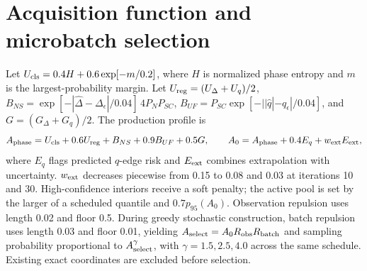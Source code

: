 \section{Acquisition function and microbatch selection}
Let $U_{\rm cls}=0.4H+0.6\exp[-m/0.2]$, where $H$ is normalized phase entropy and $m$ is the largest-probability margin. Let $U_{\rm reg}=(U_\Delta+U_q)/2$, $B_{NS}=\exp[-|\hat\Delta-\Delta_\epsilon|/0.04]\,4P_NP_{SC}$, $B_{UF}=P_{SC}\exp[-||\hat q|-q_\epsilon|/0.04]$, and $G=(G_\Delta+G_q)/2$.  The production profile is
\begin{equation} A_{\rm phase}=U_{\rm cls}+0.6U_{\rm reg}+B_{NS}+0.9B_{UF}+0.5G,\qquad A_0=A_{\rm phase}+0.4E_q+w_{\rm ext}E_{\rm ext},\end{equation}
where $E_q$ flags predicted $q$-edge risk and $E_{\rm ext}$ combines extrapolation with uncertainty. $w_{\rm ext}$ decreases piecewise from 0.15 to 0.08 and 0.03 at iterations 10 and 30. High-confidence interiors receive a soft penalty; the active pool is set by the larger of a scheduled quantile and $0.7p_{95}(A_0)$.  Observation repulsion uses length 0.02 and floor 0.5. During greedy stochastic construction, batch repulsion uses length 0.03 and floor 0.01, yielding $A_{\rm select}=A_0R_{\rm obs}R_{\rm batch}$ and sampling probability proportional to $A_{\rm select}^\gamma$, with $\gamma=1.5,2.5,4.0$ across the same schedule. Existing exact coordinates are excluded before selection.
